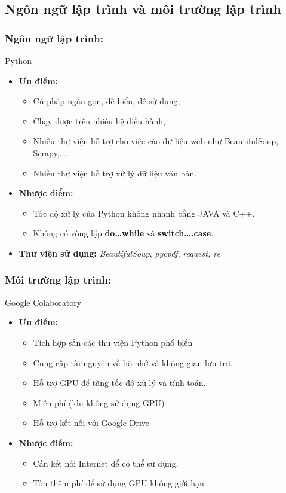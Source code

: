 \documentclass[runningheads]{llncs}
\begin{document}
\subsection{Ngôn ngữ lập trình và môi trường lập trình}

\subsubsection{Ngôn ngữ lập trình:} Python

\begin{itemize}

	\item \textbf{Ưu điểm:}
		\begin{itemize}
		\item Cú pháp ngắn gọn, dễ hiểu, dễ sử dụng,
		\item Chạy được trên nhiều hệ điều hành,
		\item Nhiều thư viện hỗ trợ cho việc cào dữ liệu web như BeautifulSoup, Scrapy,...
		\item Nhiều thư viện hỗ trợ xử lý dữ liệu văn bản.
		\end{itemize}
    

	\item \textbf{Nhược điểm:}
		\begin{itemize}
		\item Tốc độ xử lý của Python không nhanh bằng JAVA và C++.
		\item  Không có vòng lặp \textbf{do…while} và \textbf{switch….case}.
		\end{itemize}

	\item \textbf{Thư viện sử dụng:} \textit{BeautifulSoup}, \textit{pycpdf}, \textit{request, \textit{re}}
\end{itemize}

\subsubsection{Môi trường lập trình:} Google Colaboratory

\begin{itemize}
	\item \textbf{Ưu điểm:} 
		\begin{itemize}
		\item Tích hợp sẵn các thư viện Python phổ biến
		\item Cung cấp tài nguyên về bộ nhớ và không gian lưu trữ.
		\item Hỗ trợ GPU để tăng tốc độ xử lý và tính toán.
		\item Miễn phí (khi không sử dụng GPU)
		\item Hỗ trợ kết nối với Google Drive
		\end{itemize}

	\item \textbf{Nhược điểm:}
		\begin{itemize}
		\item Cần kết nối Internet để có thể sử dụng.
		\item Tốn thêm phí để sử dụng GPU không giới hạn.
		\end{itemize}
\end{itemize}
\end{document}
